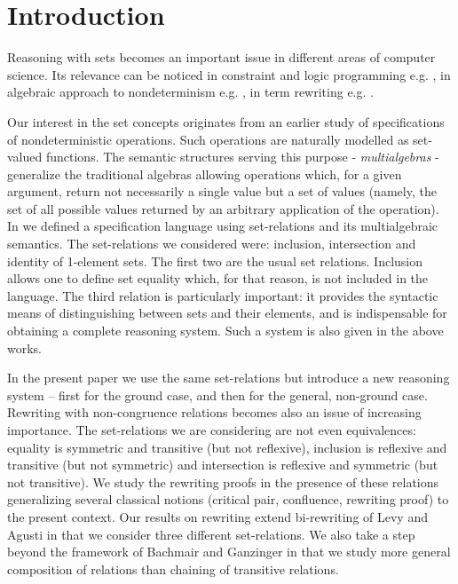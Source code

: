 

\section{Introduction}

Reasoning with sets becomes an important issue in different areas of computer 
science. Its relevance can be noticed in constraint and logic programming e.g. 
\cite{SD,DO,Jay,Sto}, in algebraic approach to nondeterminism e.g. 
\cite{HusB,PS1,MW}, in term rewriting e.g. \cite{LA,Kap,HusB}.

Our interest in the set concepts originates from an earlier study of 
specifications of nondeterministic operations. Such operations are naturally 
modelled as set-valued functions. The semantic structures serving this purpose 
- {\em multialgebras} - generalize the traditional algebras allowing operations 
which, for a given argument, return not necessarily a single value but a set of 
values (namely, the set of all possible values returned by an arbitrary 
application of the operation). In \cite{MW,Mich} we defined a specification 
language using set-relations and its multialgebraic semantics. The 
set-relations we considered were: inclusion, intersection and identity of 
1-element sets. The first two are the usual set relations. Inclusion allows one 
to define set equality which, for that reason, is not included in the language. 
The third relation is particularly important: it provides the syntactic 
\mbox{means}
of distinguishing between sets and their elements, and is indispensable for 
obtaining a complete reasoning system. Such a system is also given in the above 
works.

In the present paper we use the same set-relations but introduce a new 
reasoning system -- first for the ground case, and then for the general, 
non-ground case.
Rewriting with 
non-congruence relations becomes also an issue of increasing importance. The 
set-relations we are considering are not even equivalences: equality is 
symmetric and transitive (but not reflexive), inclusion is reflexive and 
transitive (but not symmetric) and intersection is reflexive and symmetric (but 
not transitive). We study the rewriting proofs in the presence of these 
relations generalizing several classical notions (critical pair, confluence, 
rewriting proof) to the present context. Our results on rewriting extend
bi-rewriting of Levy and Agusti \cite{LA} in that we consider three different 
set-relations. We also take a step beyond the framework of Bachmair and 
Ganzinger \cite{BG249} in that we study more general composition of relations 
than chaining of transitive relations.


